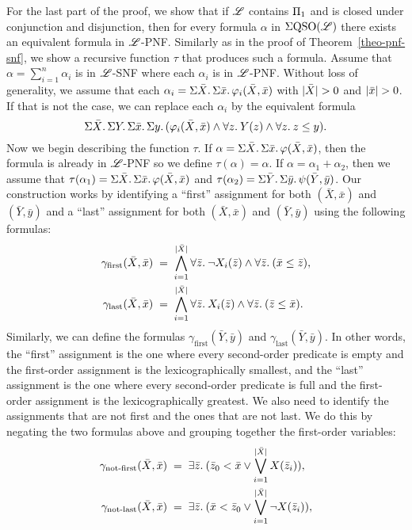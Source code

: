 For the last part of the proof, we show that if $\mathscr{L}$ contains $\Pi_{1}$ and is closed under conjunction and disjunction, then for every formula $\alpha$ in $\Sigma{\rm QSO}(\mathscr{L})$ there exists an equivalent formula in $\mathscr{L}$-PNF. 
Similarly as in the proof of Theorem~\ref{theo-pnf-snf}, we show a recursive function $\tau$ that produces such a formula. 
Assume that $\alpha = \sum_{i = 1}^n \alpha_i$ is in $\mathscr{L}$-SNF where each $\alpha_i$ is in $\mathscr{L}$-PNF. 
Without loss of generality, we assume that each $\alpha_i = \Sigma{\bar{X}}.\,\Sigma{\bar{x}}.\,\varphi_i(\bar{X},\bar{x})$ with $\vert \bar{X} \vert > 0$ and $\vert \bar{x} \vert > 0$. 
If that is not the case, we can replace each $\alpha_i$ by the equivalent formula
$$
\Sigma{\bar{X}}.\, \Sigma{Y}.\,\Sigma{\bar{x}}.\,\Sigma{y}.\,(\varphi_i(\bar{X},\bar{x})\wedge \forall{z}.\: Y(z) \wedge \forall{z}.\: z \leq y).
$$
Now we begin describing the function $\tau$. 
If $\alpha = \Sigma{\bar{X}}.\,\Sigma{\bar{x}}.\,\varphi(\bar{X},\bar{x})$, then the formula is already in $\mathscr{L}$-PNF so we define $\tau(\alpha) = \alpha$. 
If $\alpha = \alpha_1 + \alpha_2$, then we assume that $\tau(\alpha_1) = \Sigma{\bar{X}}.\,\Sigma{\bar{x}}.\,\varphi(\bar{X},\bar{x})$ and $\tau(\alpha_2) = \Sigma{\bar{Y}}.\,\Sigma{\bar{y}}.\,\psi(\bar{Y},\bar{y})$. 
Our construction works by identifying a ``first'' assignment for both $(\bar{X},\bar{x})$ and $(\bar{Y},\bar{y})$ and a ``last'' assignment for both $(\bar{X},\bar{x})$ and $(\bar{Y},\bar{y})$ using the following formulas:
\begin{align*}
\gamma_{\text{first}}(\bar{X},\bar{x}) & \; = \;  \bigwedge_{i = 1}^{\vert \bar{X} \vert} \forall{\bar{z}}.\:\neg X_i(\bar{z}) \wedge \forall{\bar{z}}.\:(\bar{x}\leq\bar{z}), \\
\gamma_{\text{last}}(\bar{X},\bar{x}) & \; = \;  \bigwedge_{i = 1}^{\vert \bar{X} \vert} \forall{\bar{z}}.\: X_i(\bar{z}) \wedge \forall{\bar{z}}.\:(\bar{z}\leq\bar{x}).
\end{align*}
Similarly, we can define the formulas $\gamma_{\text{first}}(\bar{Y},\bar{y})$ and $\gamma_{\text{last}}(\bar{Y},\bar{y})$.
In other words, the ``first'' assignment is the one where every second-order predicate is empty and the first-order assignment is the lexicographically smallest, and the ``last'' assignment is the one where every second-order predicate is full and the first-order assignment is the lexicographically greatest. 
We also need to identify the assignments that are not first and the ones that are not last. 
We do this by negating the two formulas above and grouping together the first-order variables:
\begin{align*}
\gamma_{\text{not-first}}(\bar{X},\bar{x}) & \; = \; \exists{\bar{z}}.\:(\bar{z}_0 < \bar{x} \vee \bigvee_{i = 1}^{\vert \bar{X} \vert}X(\bar{z}_i)), \\
\gamma_{\text{not-last}}(\bar{X},\bar{x}) & \; = \; \exists{\bar{z}}.\:(\bar{x} < \bar{z}_0 \vee \bigvee_{i = 1}^{\vert \bar{X} \vert}\neg X(\bar{z}_i)),
\end{align*}

